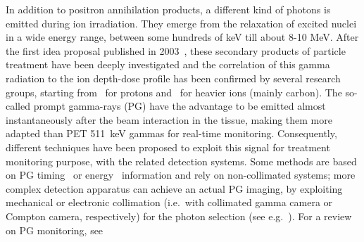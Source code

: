 In addition to positron annihilation products, a different kind of photons is emitted during ion irradiation. They emerge from the relaxation of excited nuclei in a wide energy range, between some hundreds of keV till about 8-10 MeV. After the first idea proposal published in 2003~\cite{PG_first}, these secondary products of particle treatment have been deeply investigated and the correlation of this gamma radiation to the ion depth-dose profile has been confirmed by several research groups, starting from~\cite{Min_PG} for protons and~\cite{Testa_PG} for heavier ions (mainly carbon). The so-called prompt gamma-rays (PG) have the advantage to be emitted almost instantaneously after the beam interaction in the tissue, making them more adapted than PET 511~keV gammas for real-time monitoring. Consequently, different techniques have been proposed to exploit this signal for treatment monitoring purpose, with the related detection systems. Some methods are based on PG timing~\cite{Golnik:2014aa, Krimmer_PGPI} or energy~\cite{Verburg:2014aa} information and rely on non-collimated systems; more complex detection apparatus can achieve an actual PG imaging, by exploiting mechanical or electronic collimation (i.e.~with collimated gamma camera or Compton camera, respectively) for the photon selection (see e.g.~\cite{Min_PG, Bom_collimated, Smeets:2012aa, Roellinghoff_2014, Priegnitz:2015aa, Frandes_2010, LLOSA2012105, KORMOLL2011114, MCCLESKEY2015163, Matsuoka:2014qna, Peterson:2010aa, Solevi:2016aa, ALDAWOOD2017190}). For a review on PG monitoring, see~\cite{krimmer:hal-01585334}

